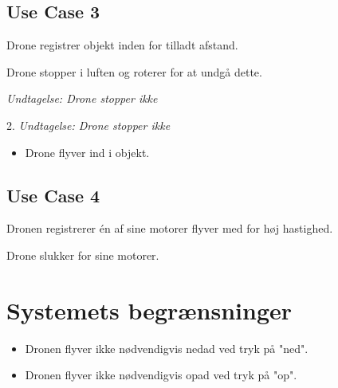 \documentclass[Main]{subfiles}
\begin{document}
\subsection{Use Case 3}
\begin{UseCase}

	\begin{normFor}
	\item Drone registrer objekt inden for tilladt afstand.
	\item Drone stopper i luften og roterer for at undgå dette.
	\item[] \textit{Undtagelse: Drone stopper ikke}
	\end{normFor} 

	\begin{normFor}
	\item[2.] \textit{Undtagelse: Drone stopper ikke}
		\begin{itemize}
		\item Drone flyver ind i objekt.
		\end{itemize}
	\end{normFor} 
	
\end{UseCase}


\subsection{Use Case 4}
\begin{UseCase}

	\begin{normFor}
	\item Dronen registrerer én af sine motorer flyver med for høj hastighed.
	\item Drone slukker for sine motorer.
	\end{normFor} 
\end{UseCase}

	
\section{Systemets begrænsninger}
\begin{itemize}
\item Dronen flyver ikke nødvendigvis nedad ved tryk på "ned".
\item Dronen flyver ikke nødvendigvis opad ved tryk på "op".
\end{itemize}
\end{document}
